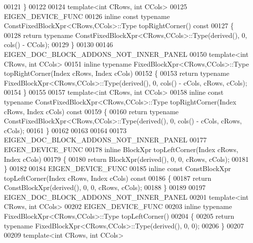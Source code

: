 \begin{DoxyCode}
00121 \}
00122 
00124 \textcolor{keyword}{template}<\textcolor{keywordtype}{int} CRows, \textcolor{keywordtype}{int} CCols>
00125 EIGEN\_DEVICE\_FUNC
00126 \textcolor{keyword}{inline} \textcolor{keyword}{const} \textcolor{keyword}{typename} ConstFixedBlockXpr<CRows,CCols>::Type topRightCorner()\textcolor{keyword}{ const}
00127 \textcolor{keyword}{}\{
00128   \textcolor{keywordflow}{return} \textcolor{keyword}{typename} ConstFixedBlockXpr<CRows,CCols>::Type(derived(), 0, cols() - CCols);
00129 \}
00130 
00146 EIGEN\_DOC\_BLOCK\_ADDONS\_NOT\_INNER\_PANEL
00150 \textcolor{keyword}{template}<\textcolor{keywordtype}{int} CRows, \textcolor{keywordtype}{int} CCols>
00151 \textcolor{keyword}{inline} \textcolor{keyword}{typename} FixedBlockXpr<CRows,CCols>::Type topRightCorner(Index cRows, Index cCols)
00152 \{
00153   \textcolor{keywordflow}{return} \textcolor{keyword}{typename} FixedBlockXpr<CRows,CCols>::Type(derived(), 0, cols() - cCols, cRows, cCols);
00154 \}
00155 
00157 \textcolor{keyword}{template}<\textcolor{keywordtype}{int} CRows, \textcolor{keywordtype}{int} CCols>
00158 \textcolor{keyword}{inline} \textcolor{keyword}{const} \textcolor{keyword}{typename} ConstFixedBlockXpr<CRows,CCols>::Type topRightCorner(Index cRows, Index cCols)\textcolor{keyword}{ const}
00159 \textcolor{keyword}{}\{
00160   \textcolor{keywordflow}{return} \textcolor{keyword}{typename} ConstFixedBlockXpr<CRows,CCols>::Type(derived(), 0, cols() - cCols, cRows, cCols);
00161 \}
00162 
00163 
00164 
00173 EIGEN\_DOC\_BLOCK\_ADDONS\_NOT\_INNER\_PANEL
00177 EIGEN\_DEVICE\_FUNC
00178 \textcolor{keyword}{inline} BlockXpr topLeftCorner(Index cRows, Index cCols)
00179 \{
00180   \textcolor{keywordflow}{return} BlockXpr(derived(), 0, 0, cRows, cCols);
00181 \}
00182 
00184 EIGEN\_DEVICE\_FUNC
00185 \textcolor{keyword}{inline} \textcolor{keyword}{const} ConstBlockXpr topLeftCorner(Index cRows, Index cCols)\textcolor{keyword}{ const}
00186 \textcolor{keyword}{}\{
00187   \textcolor{keywordflow}{return} ConstBlockXpr(derived(), 0, 0, cRows, cCols);
00188 \}
00189 
00197 EIGEN\_DOC\_BLOCK\_ADDONS\_NOT\_INNER\_PANEL
00201 \textcolor{keyword}{template}<\textcolor{keywordtype}{int} CRows, \textcolor{keywordtype}{int} CCols>
00202 EIGEN\_DEVICE\_FUNC
00203 \textcolor{keyword}{inline} \textcolor{keyword}{typename} FixedBlockXpr<CRows,CCols>::Type topLeftCorner()
00204 \{
00205   \textcolor{keywordflow}{return} \textcolor{keyword}{typename} FixedBlockXpr<CRows,CCols>::Type(derived(), 0, 0);
00206 \}
00207 
00209 \textcolor{keyword}{template}<\textcolor{keywordtype}{int} CRows, \textcolor{keywordtype}{int} CCols>

\end{DoxyCode}
